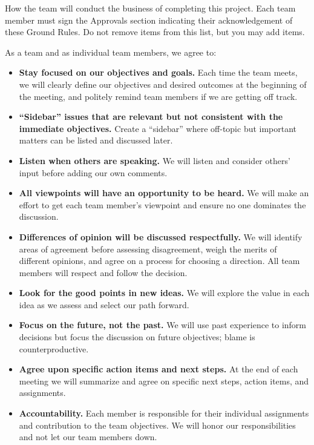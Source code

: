 \begin{guidance}
How the team will conduct the business of completing this project. Each team member must sign the Approvals section indicating their acknowledgement of these Ground Rules. Do not remove items from this list, but you may add items.
\end{guidance}

\noindent As a team and as individual team members, we agree to:
\begin{itemize}[leftmargin=1.4em]
  \item \textbf{Stay focused on our objectives and goals.} Each time the team meets, we will clearly define our objectives and desired outcomes at the beginning of the meeting, and politely remind team members if we are getting off track.
  \item \textbf{``Sidebar'' issues that are relevant but not consistent with the immediate objectives.} Create a ``sidebar'' where off-topic but important matters can be listed and discussed later.
  \item \textbf{Listen when others are speaking.} We will listen and consider others' input before adding our own comments.
  \item \textbf{All viewpoints will have an opportunity to be heard.} We will make an effort to get each team member's viewpoint and ensure no one dominates the discussion.
  \item \textbf{Differences of opinion will be discussed respectfully.} We will identify areas of agreement before assessing disagreement, weigh the merits of different opinions, and agree on a process for choosing a direction. All team members will respect and follow the decision.
  \item \textbf{Look for the good points in new ideas.} We will explore the value in each idea as we assess and select our path forward.
  \item \textbf{Focus on the future, not the past.} We will use past experience to inform decisions but focus the discussion on future objectives; blame is counterproductive.
  \item \textbf{Agree upon specific action items and next steps.} At the end of each meeting we will summarize and agree on specific next steps, action items, and assignments.
  \item \textbf{Accountability.} Each member is responsible for their individual assignments and contribution to the team objectives. We will honor our responsibilities and not let our team members down.
\end{itemize}

